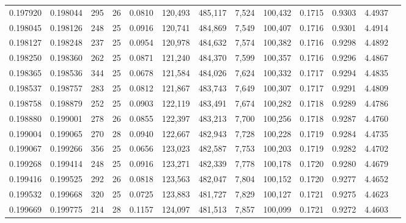 \begin{tabular}{rrrrrrrrrrrrr}
0.197920 & 0.198044 &   295 &  26 &                                     0.0810 & 120,493 & 485,117 &   7,524 & 100,432 & 0.1715 & 0.9303 & 4.4937 \\
0.198045 & 0.198126 &   248 &  25 &                                     0.0916 & 120,741 & 484,869 &   7,549 & 100,407 & 0.1716 & 0.9301 & 4.4914 \\
0.198127 & 0.198248 &   237 &  25 &                                     0.0954 & 120,978 & 484,632 &   7,574 & 100,382 & 0.1716 & 0.9298 & 4.4892 \\
0.198250 & 0.198360 &   262 &  25 &                                     0.0871 & 121,240 & 484,370 &   7,599 & 100,357 & 0.1716 & 0.9296 & 4.4867 \\
0.198365 & 0.198536 &   344 &  25 &                                     0.0678 & 121,584 & 484,026 &   7,624 & 100,332 & 0.1717 & 0.9294 & 4.4835 \\
0.198537 & 0.198757 &   283 &  25 &                                     0.0812 & 121,867 & 483,743 &   7,649 & 100,307 & 0.1717 & 0.9291 & 4.4809 \\
0.198758 & 0.198879 &   252 &  25 &                                     0.0903 & 122,119 & 483,491 &   7,674 & 100,282 & 0.1718 & 0.9289 & 4.4786 \\
0.198880 & 0.199001 &   278 &  26 &                                     0.0855 & 122,397 & 483,213 &   7,700 & 100,256 & 0.1718 & 0.9287 & 4.4760 \\
0.199004 & 0.199065 &   270 &  28 &                                     0.0940 & 122,667 & 482,943 &   7,728 & 100,228 & 0.1719 & 0.9284 & 4.4735 \\
0.199067 & 0.199266 &   356 &  25 &                                     0.0656 & 123,023 & 482,587 &   7,753 & 100,203 & 0.1719 & 0.9282 & 4.4702 \\
0.199268 & 0.199414 &   248 &  25 &                                     0.0916 & 123,271 & 482,339 &   7,778 & 100,178 & 0.1720 & 0.9280 & 4.4679 \\
0.199416 & 0.199525 &   292 &  26 &                                     0.0818 & 123,563 & 482,047 &   7,804 & 100,152 & 0.1720 & 0.9277 & 4.4652 \\
0.199532 & 0.199668 &   320 &  25 &                                     0.0725 & 123,883 & 481,727 &   7,829 & 100,127 & 0.1721 & 0.9275 & 4.4623 \\
0.199669 & 0.199775 &   214 &  28 &                                     0.1157 & 124,097 & 481,513 &   7,857 & 100,099 & 0.1721 & 0.9272 & 4.4603 \\

\end{tabular}
